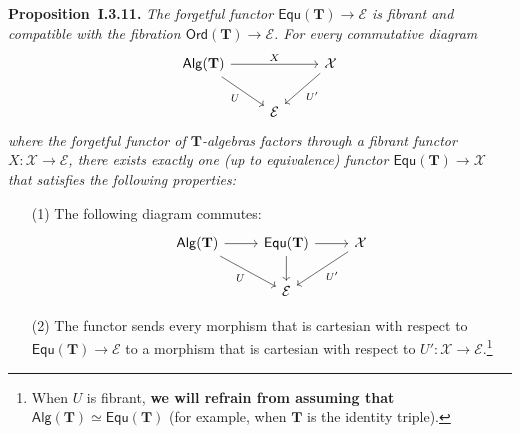\documentclass{article}
\newenvironment{itenv}[1]
  {\phantomsection\par\medskip\noindent\textbf{#1.}\itshape}
  {\par\medskip}
\newcommand{\unsure}[1]{{\color{purple}\textbf{#1}}}
\newcommand{\TT}{\mathbf{T}}
\newcommand{\cat}[1]{\mathcal{#1}}
\newcommand{\Cat}[1]{\mathsf{#1}}
\newcommand{\Alg}[1]{\Cat{Alg}(#1)}
\newcommand{\Ord}[1]{\Cat{Ord}(#1)}
\newcommand{\Equ}[1]{\Cat{Equ}(#1)}
\begin{document}
\begin{itenv}{Proposition~I.3.11}
  The forgetful functor $\Equ{\TT}\to\cat{E}$ is fibrant and compatible with the fibration $\Ord{\TT}\to\cat{E}$.
  For every commutative diagram
  \[
    \begin{tikzcd}
      \Alg{\TT}
        \ar[rr,"X"]
        \ar[dr,swap,"U"]
    &&\cat{X}
        \ar[dl,"U'"]
    \\&\cat{E}
    \end{tikzcd}
  \]
  where the forgetful functor of $\TT$-algebras factors through a fibrant functor $X\colon\cat{X}\to\cat{E}$, there exists exactly one (up to equivalence) functor $\Equ{\TT}\to\cat{X}$ that satisfies the following properties:
  \begin{enumerate}
    \item[(1)] The following diagram commutes:
      \[
        \begin{tikzcd}
          \Alg{\TT}
            \ar[r]
            \ar[dr,swap,"U"]
        & \Equ{\TT}
            \ar[r]
            \ar[d]
        & \cat{X}
            \ar[dl,"U'"]
        \\&\cat{E}
        \end{tikzcd}
      \]

    \item[(2)] The functor sends every morphism that is cartesian with respect to $\Equ{\TT}\to\cat{E}$ to a morphism that is cartesian with respect to $U'\colon\cat{X}\to\cat{E}$.\footnote{When $U$ is fibrant, \unsure{we will refrain from assuming that $\Alg{\TT}\simeq\Equ{\TT}$} (for example, when $\TT$ is the identity triple).}
  \end{enumerate}
\end{itenv}
\end{document}
